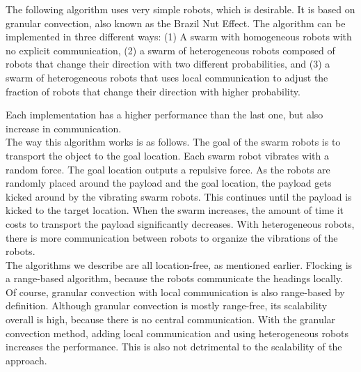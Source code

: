 The following algorithm uses very simple robots, which is desirable. \cite{sugawara2012object}
It is based on granular convection, also known as the Brazil Nut Effect.
The algorithm can be implemented in three different ways: (1) A swarm with homogeneous robots with no explicit communication,
(2) a swarm of heterogeneous robots composed of robots that change their direction with two different probabilities,
and (3) a swarm of heterogeneous robots that uses local communication to adjust the fraction of robots that change their direction with higher probability.

Each implementation has a higher performance than the last one, but also increase in communication.\\
The way this algorithm works is as follows.
The goal of the swarm robots is to transport the object to the goal location.
Each swarm robot vibrates with a random force. The goal location outputs a repulsive force.
As the robots are randomly placed around the payload and the goal location, the payload gets kicked around by the vibrating swarm robots.
This continues until the payload is kicked to the target location.
When the swarm increases, the amount of time it costs to transport the payload significantly decreases.
With heterogeneous robots, there is more communication between robots to organize the vibrations of the robots.\\

The algorithms we describe are all location-free, as mentioned earlier.
Flocking is a range-based algorithm, because the robots communicate the headings locally.
Of course, granular convection with local communication is also range-based by definition.
Although granular convection is mostly range-free, its scalability overall is high, because there is no central communication.
With the granular convection method, adding local communication and using heterogeneous robots increases the performance.
This is also not detrimental to the scalability of the approach.

